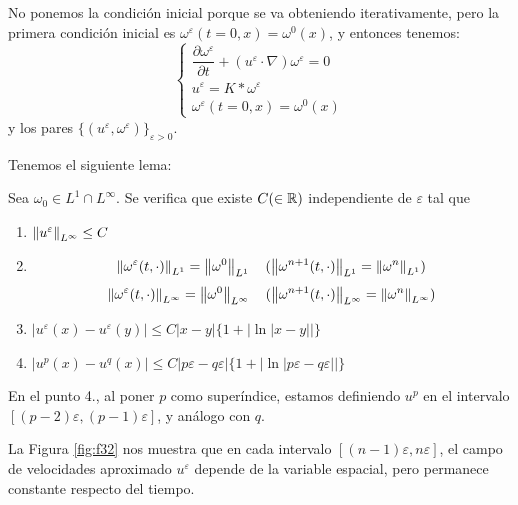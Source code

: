 \begin{observacion}
    No ponemos la condición inicial porque se va obteniendo iterativamente, pero la primera condición inicial es $\omega^\varepsilon(t=0,x) =
    \omega^0(x)$, y entonces tenemos:
    \begin{equation*}
        \begin{cases}
            \dfrac{\partial \omega^\varepsilon}{\partial t} + (u^\varepsilon \cdot \nabla) \omega^\varepsilon = 0 \\ 
            u^\varepsilon = K \ast \omega^\varepsilon \\
            \omega^\varepsilon(t=0,x) = \omega^0(x)
        \end{cases}
    \end{equation*}
    y los pares $\{(u^\varepsilon, \omega^\varepsilon)\}_{\varepsilon > 0}$.
\end{observacion}

Tenemos el siguiente lema:

\begin{lema}\label{lema:l31}
    Sea $\omega_0 \in L^1 \cap L^\infty$. Se verifica que existe $C (\in \mathbb{R})$ independiente de $\varepsilon$ tal que 
    \begin{enumerate}
        \item $\left\lVert u^\varepsilon \right\rVert_{L^\infty} \leq C$
        \item $$\left\lVert \omega^\varepsilon(t, \cdot) \right\rVert_{L^1} = \left\lVert \omega^0 \right\rVert_{L^1} \quad (\left\lVert \omega^{n+1}(t, \cdot) \right\rVert_{L^1} = \left\lVert \omega^n \right\rVert_{L^1})$$
        $$\left\lVert \omega^\varepsilon(t, \cdot) \right\rVert_{L^\infty} = \left\lVert \omega^0 \right\rVert_{L^\infty} \quad (\left\lVert \omega^{n+1}(t, \cdot) \right\rVert_{L^\infty} = \left\lVert \omega^n \right\rVert_{L^\infty})$$
        \item $|u^\varepsilon(x) - u^\varepsilon(y)| \leq C|x-y|\{1 + |\ln|x-y||\}$
        \item $|u^p(x) - u^q(x)| \leq C |p \varepsilon - q \varepsilon| \{1 + |\ln|p \varepsilon - q \varepsilon||\}$
    \end{enumerate}
\end{lema}

\begin{observacion}
    En el punto 4., al poner $p$ como superíndice, estamos definiendo $u^p$ en el intervalo $[(p-2)\varepsilon, (p-1)\varepsilon]$, y análogo con $q$.
\end{observacion}

La Figura \ref{fig:f32} nos muestra que en cada intervalo $\left[(n-1)\varepsilon, n\varepsilon \right]$, el campo de velocidades aproximado $u^\varepsilon$ depende de la variable espacial, pero permanece constante respecto del tiempo.


